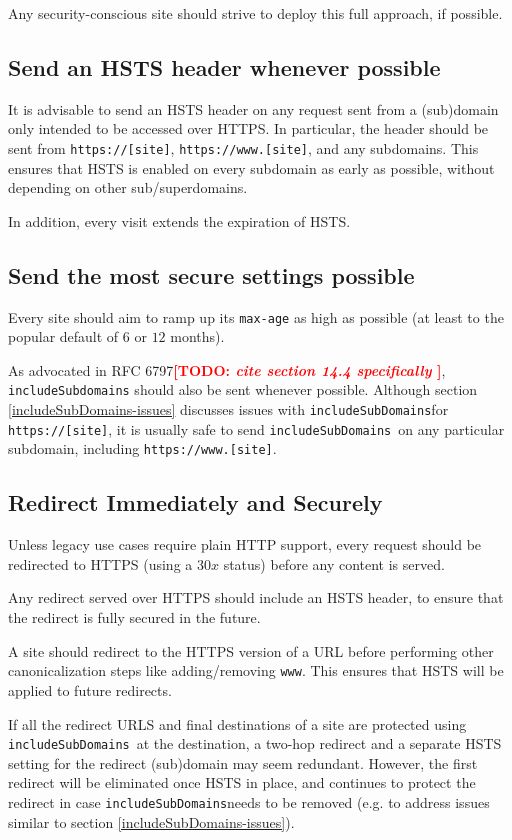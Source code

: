 \documentclass[conference]{./IEEEtran}
\newcommand{\td}[2]{\textcolor{red}{\textbf{[TODO: {\it{#1}} #2]}}}
\newcommand{\site}[1]{\texttt{#1}}
\newcommand{\code}[1]{\texttt{#1}}
\newcommand{\iSD}{{\code{includeSubDomains}}}
\newcommand{\genericsite}{[site]}
\newcommand{\s}{{\site{https://\genericsite}}}
\newcommand{\sw}{{\site{https://www.\genericsite}}}
\theoremstyle{plain}
\begin{document}
Any security-conscious site should strive to deploy this full approach, if possible.

\subsection{Send an HSTS header whenever possible}

It is advisable to send an HSTS header on any request sent from a (sub)domain only intended to be accessed over HTTPS. In particular, the header should be sent from \s, \sw, and any subdomains. This ensures that HSTS is enabled on every subdomain as early as possible, without depending on other sub/superdomains.

In addition, every visit extends the expiration of HSTS.

\subsection{Send the most secure settings possible}

Every site should aim to ramp up its \code{max-age} as high as possible (at least to the popular default of $6$ or $12$ months).

As advocated in RFC 6797\td{cite section 14.4 specifically}{\cite{rfc}}, \code{includeSubdomains} should also be sent whenever possible. Although section \ref{includeSubDomains-issues} discusses issues with \iSD for \s, it is usually safe to send \iSD~on any particular subdomain, including \sw.

\subsection{Redirect Immediately and Securely}

Unless legacy use cases require plain HTTP support, every request should be redirected to HTTPS (using a $30x$ status) before any content is served.

Any redirect served over HTTPS should include an HSTS header, to ensure that the redirect is fully secured in the future.

A site should redirect to the HTTPS version of a URL before performing other canonicalization steps like adding/removing \code{www}. This ensures that HSTS will be applied to future redirects.

If all the redirect URLS and final destinations of a site are protected using \iSD~at the destination, a two-hop redirect and a separate HSTS setting for the redirect (sub)domain may seem redundant. However, the first redirect will be eliminated once HSTS in place, and continues to protect the redirect in case \iSD needs to be removed (e.g. to address issues similar to section \ref{includeSubDomains-issues}).
\end{document}
